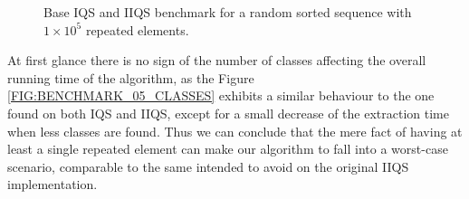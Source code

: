 \begin{figure}
    \caption{Base IQS and IIQS benchmark for a random sorted sequence with $1\times10^5$ repeated elements.}
    \label{FIG:BENCHMARK_04_SINGLE_CLASS}
\end{figure}

At first glance there is no sign of the number of classes affecting the overall running time of the algorithm, as the Figure \ref{FIG:BENCHMARK_05_CLASSES} exhibits a similar behaviour to the one found on both IQS and IIQS, except for a small decrease of the extraction time when less classes are found. Thus we can conclude that the mere fact of having at least a single repeated element can make our algorithm to fall into a worst-case scenario, comparable to the same intended to avoid on the original IIQS implementation.\\

\FloatBarrier
